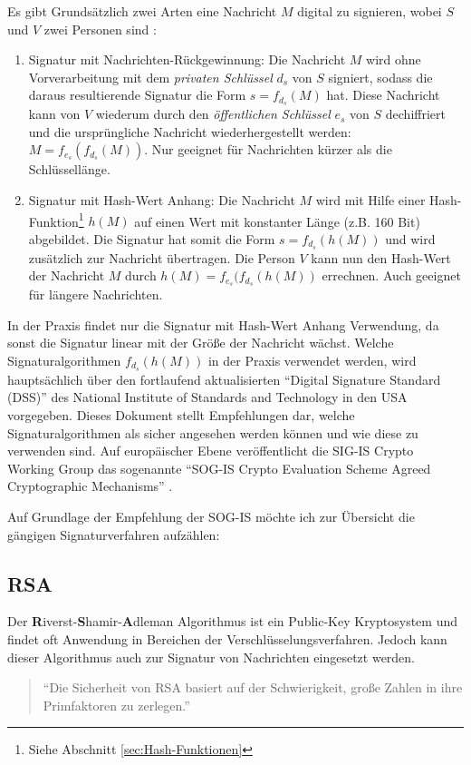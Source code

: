 \documentclass[11pt,a4paper,ngerman]{scrreprt}
\begin{document}
Es gibt Grundsätzlich zwei Arten eine Nachricht $M$ digital zu signieren, wobei $S$ und $V$ zwei Personen sind \cite[S. 28-29]{kryptSec11}:
\begin{enumerate}
    \item Signatur mit Nachrichten-Rückgewinnung: Die Nachricht $M$ wird ohne Vorverarbeitung mit dem \emph{privaten Schlüssel} $d_s$ von $S$ signiert, sodass die daraus resultierende Signatur die Form $s = f_{d_s}(M)$ hat. Diese Nachricht kann von $V$ wiederum durch den \emph{öffentlichen Schlüssel} $e_s$ von $S$ dechiffriert und die ursprüngliche Nachricht wiederhergestellt werden: $M = f_{e_s}(f_{d_s}(M))$. Nur geeignet für Nachrichten kürzer als die Schlüssellänge.
    \item Signatur mit Hash-Wert Anhang: Die Nachricht $M$ wird mit Hilfe einer Hash-Funktion\footnote{Siehe Abschnitt \ref{sec:Hash-Funktionen}} $h(M)$ auf einen Wert mit konstanter Länge (z.B. 160 Bit) abgebildet. Die Signatur hat somit die Form $s = f_{d_s}(h(M))$ und wird zusätzlich zur Nachricht übertragen. Die Person $V$ kann nun den Hash-Wert der Nachricht $M$ durch $h(M) = f_{e_s}(f_{d_s}(h(M))$ errechnen. Auch geeignet für längere Nachrichten.
\end{enumerate}
In der Praxis findet nur die Signatur mit Hash-Wert Anhang Verwendung, da sonst die Signatur linear mit der Größe der Nachricht wächst. Welche Signaturalgorithmen $f_{d_s}(h(M))$ in der Praxis verwendet werden, wird hauptsächlich über den fortlaufend aktualisierten ``Digital Signature Standard (DSS)'' des National Institute of Standards and Technology in den USA vorgegeben. Dieses Dokument stellt Empfehlungen dar, welche Signaturalgorithmen als sicher angesehen werden können und wie diese zu verwenden sind. Auf europäischer Ebene veröffentlicht die SIG-IS Crypto Working Group das sogenannte ``SOG-IS Crypto Evaluation Scheme Agreed Cryptographic Mechanisms'' \cite{sogisACM}.

Auf Grundlage der Empfehlung der SOG-IS möchte ich zur Übersicht die gängigen Signaturverfahren aufzählen:
\subsection{RSA}
Der \textbf{R}iverst-\textbf{S}hamir-\textbf{A}dleman Algorithmus ist ein Public-Key Kryptosystem und findet oft Anwendung in Bereichen der Verschlüsselungsverfahren. Jedoch kann dieser Algorithmus auch zur Signatur von Nachrichten eingesetzt werden. 
\begin{quote}
    ``Die Sicherheit von RSA basiert auf der Schwierigkeit, große Zahlen in ihre Primfaktoren zu zerlegen.'' \cite[S. 82]{ertel12}
\end{quote}
\end{document}
